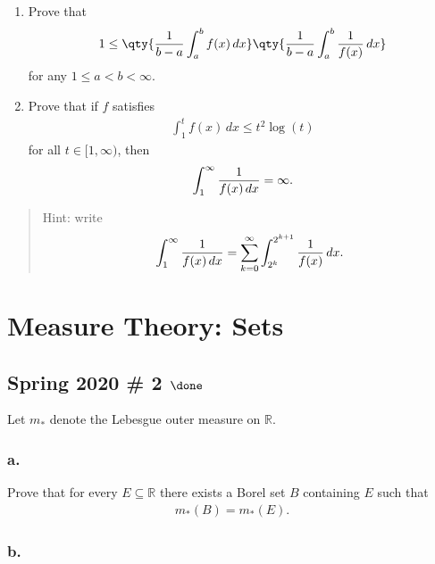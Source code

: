 \begin{enumerate}
\def\labelenumi{\alph{enumi}.}
\item
  Prove that
  \begin{align*}  
  1 \leq \qty{
  {1 \over b-a} \int_a^b f(x) \,dx
  }\qty{
  {1\over b-a} \int_a^b {1 \over f(x)}\, dx
  }
  \end{align*}
  for any \(1\leq a < b <\infty\).
\item
  Prove that if \(f\) satisfies
  \begin{align*}  
  \int_1^t f(x) \, dx \leq t^2 \log(t)
  \end{align*}
  for all \(t\in [1, \infty)\), then
  \begin{align*}  
  \int_1^\infty {1\over f(x) \,dx} = \infty
  .\end{align*}
\end{enumerate}

\begin{quote}
Hint: write
\begin{align*}  
\int_1^\infty {1\over f(x) \, dx} = \sum_{k=0}^\infty \int_{2^k}^{2^{k+1}} {1 \over f(x)}\,dx
.\end{align*}
\end{quote}

\hypertarget{measure-theory-sets}{%
\section{Measure Theory: Sets}\label{measure-theory-sets}}

\hypertarget{spring-2020-2-done}{%
\subsection{\texorpdfstring{Spring 2020 \# 2
\(\done\)}{Spring 2020 \# 2 \textbackslash done}}\label{spring-2020-2-done}}

Let \(m_*\) denote the Lebesgue outer measure on \({\mathbb{R}}\).

\hypertarget{a.}{%
\subsubsection{a.}\label{a.}}

Prove that for every \(E\subseteq {\mathbb{R}}\) there exists a Borel
set \(B\) containing \(E\) such that
\begin{align*}
m_*(B) = m_*(E)
.\end{align*}

\hypertarget{b.}{%
\subsubsection{b.}\label{b.}}

